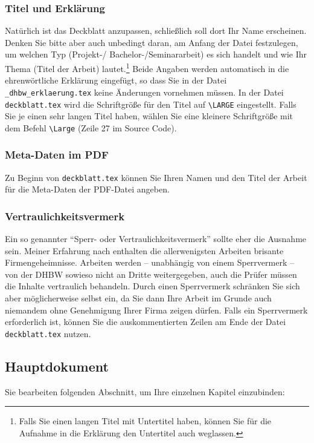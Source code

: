 \subsubsection{Titel und Erklärung}
Natürlich ist das Deckblatt anzupassen, schließlich soll dort Ihr Name erscheinen. Denken Sie bitte aber auch unbedingt daran, am Anfang der Datei festzulegen, um welchen Typ (Projekt-/ Bachelor-/Seminararbeit) es sich handelt und wie Ihr Thema (Titel der Arbeit) lautet.\footnote{%
Falls Sie einen langen Titel mit Untertitel haben, können Sie für die Aufnahme in die Erklärung den Untertitel auch weglassen.} Beide Angaben werden automatisch in die ehrenwörtliche Erklärung eingefügt, so dass Sie in der Datei \verb|_dhbw_erklaerung.tex| keine Änderungen vornehmen müssen.
In der Datei \verb|deckblatt.tex| wird die Schriftgröße für den Titel auf \verb|\LARGE| eingestellt. Falls Sie je einen sehr langen Titel haben, wählen Sie eine kleinere Schriftgröße mit dem Befehl \verb|\Large| (Zeile 27 im Source Code).

\subsubsection{Meta-Daten im PDF}
Zu Beginn von \verb|deckblatt.tex| können Sie Ihren Namen und den Titel der Arbeit für die Meta-Daten der PDF-Datei angeben. 


\subsubsection{Vertraulichkeitsvermerk}
Ein so genannter \enquote{Sperr- oder Vertraulichkeitsvermerk} sollte eher die Ausnahme sein. Meiner Erfahrung nach enthalten die allerwenigsten Arbeiten brisante Firmengeheimnisse. Arbeiten werden -- unabhängig von einem Sperrvermerk -- von der DHBW sowieso nicht an Dritte weitergegeben, auch die Prüfer müssen die Inhalte vertraulich behandeln. Durch einen Sperrvermerk schränken Sie sich aber möglicherweise selbst ein, da Sie dann Ihre Arbeit im Grunde auch niemandem ohne Genehmigung Ihrer Firma zeigen dürfen.
Falls ein Sperrvermerk erforderlich ist, können Sie die auskommentierten Zeilen am Ende der Datei \verb|deckblatt.tex| nutzen.

\subsection{Hauptdokument}

Sie bearbeiten folgenden Abschnitt, um Ihre einzelnen Kapitel einzubinden:
\lstset{language=}


